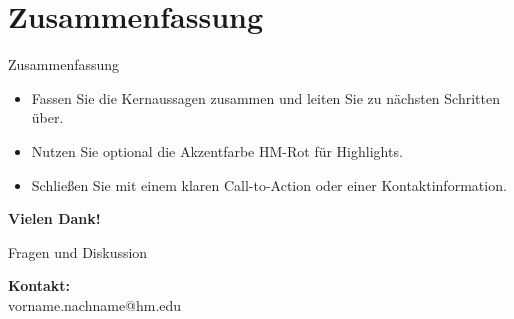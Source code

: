 \documentclass[aspectratio=169,10pt]{beamer}
\begin{document}
\section{Zusammenfassung}
\begin{frame}{Zusammenfassung}
\begin{itemize}
  \item Fassen Sie die Kernaussagen zusammen und leiten Sie zu nächsten Schritten über.
  \item Nutzen Sie optional die Akzentfarbe \textcolor{HMRed}{HM-Rot} für Highlights.
  \item Schließen Sie mit einem klaren Call-to-Action oder einer Kontaktinformation.
\end{itemize}
\end{frame}

\begin{frame}[plain]
\begin{center}
  \vspace{2cm}
  {\Huge \textbf{Vielen Dank!}}
  
  \vspace{1cm}
  {\Large Fragen und Diskussion}
  
  \vspace{1.5cm}
  \textbf{Kontakt:}\\
  vorname.nachname@hm.edu
\end{center}
\end{frame}
\end{document}
